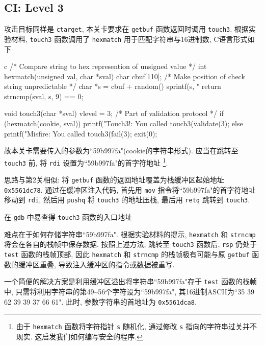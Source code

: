 \subsection{CI: Level 3}

攻击目标同样是 \verb|ctarget|, 本关卡要求在 \verb|getbuf| 函数返回时调用 \verb|touch3|. 根据实验材料, \verb|touch3| 函数调用了 \verb|hexmatch| 用于匹配字符串与16进制数, C语言形式如下
\begin{code}{c}
    /* Compare string to hex represention of unsigned value */ 
    int hexmatch(unsigned val, char *sval) 
    { 
        char cbuf[110]; 
        /* Make position of check string unpredictable */ 
        char *s = cbuf + random() %
        sprintf(s, "%
        return strncmp(sval, s, 9) == 0; 
    } 
    
    void touch3(char *sval) 
    { 
        vlevel = 3; /* Part of validation protocol */ 
        if (hexmatch(cookie, sval)) { 
            printf("Touch3!: You called touch3(\"%
            validate(3); 
        } else { 
            printf("Misfire: You called touch3(\"%
            fail(3); 
        } 
        exit(0); 
    } 
\end{code}

故本关卡需要传入的参数为“59b997fa"(cookie的字符串形式). 应当在跳转至 \verb|touch3| 前, 将 \verb|rdi| 设置为“59b997fa"的首字符地址 \footnote{由于 \texttt{hexmatch} 函数将字符指针 \texttt{s} 随机化, 通过修改 \texttt{s} 指向的字符串过关并不现实. 这启发我们如何编写安全的程序.}.

思路与第2关相似: 将 \verb|getbuf| 函数的返回地址覆盖为栈缓冲区起始地址 \verb|0x5561dc78|. 通过在缓冲区注入代码, 首先用 \verb|mov| 指令将“59b997fa"的首字符地址移动到 \verb|rdi|, 然后用 \verb|pushq| 将 \verb|touch3| 的地址压栈, 最后用 \verb|retq| 跳转到 \verb|touch3|. 

在 \verb|gdb| 中易查得 \verb|touch3| 函数的入口地址

难点在于如何存储字符串“59b997fa". 根据实验材料的提示, \verb|hexmatch| 和 \verb|strncmp| 将会在各自的栈帧中保存数据. 按照上述方法, 跳转至 \verb|touch3| 函数后, \verb|rsp| 仍处于 \verb|test| 函数的栈帧顶部, 因此 \verb|hexmatch| 和 \verb|strncmp| 的栈帧极有可能与原 \verb|getbuf| 函数的缓冲区重叠, 导致注入缓冲区的指令或数据被重写. 

一个简便的解决方案是利用缓冲区溢出将字符串“59b997fa"存于 \verb|test| 函数的栈帧中, 只需将利用字符串的第49\textasciitilde56个字符设为“59b997fa", 其16进制ASCII为“35 39 62 39 39 37 66 61". 此时, 参数字符串的首地址为 \verb|0x5561dca8|.

